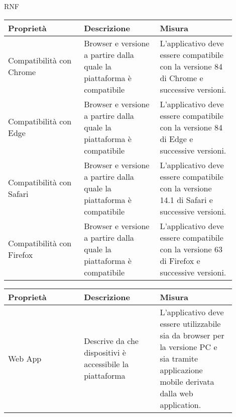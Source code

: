 \begin{listaPersonale}{RNF}
    \newpage
    \begin{tabular}{|p{0.3\linewidth}|p{0.3\linewidth}|p{0.3\linewidth}|}
        \hline
        \rowcolor{viola} \textbf{Proprietà} &
        \textbf{Descrizione}                &
        \textbf{Misura}                       \\
        \hline
        Compatibilità con Chrome            &
        Browser e versione a partire dalla
        quale la piattaforma è compatibile  &
        L'applicativo deve essere
        compatibile con la versione
        84 di Chrome e successive versioni.   \\
        \hline
        Compatibilità con Edge              &
        Browser e versione a partire dalla
        quale la piattaforma è compatibile  &
        L'applicativo deve essere
        compatibile con la versione
        84 di Edge e successive versioni.     \\
        \hline
        Compatibilità con Safari            &
        Browser e versione a partire dalla
        quale la piattaforma è compatibile  &
        L'applicativo deve essere
        compatibile con la versione
        14.1 di Safari e successive versioni. \\
        \hline
        Compatibilità con Firefox           &
        Browser e versione a partire dalla
        quale la piattaforma è compatibile  &
        L'applicativo deve essere
        compatibile con la versione
        63 di Firefox e successive versioni.  \\
        \hline
    \end{tabular}

    \begin{tabular}{|p{0.3\linewidth}|p{0.3\linewidth}|p{0.3\linewidth}|}
        \hline
        \rowcolor{viola} \textbf{Proprietà}                      &
        \textbf{Descrizione}                                     &
        \textbf{Misura}                                            \\
        \hline
        Web App                                                  &
        Descrive da che dispositivi è accessibile la piattaforma &
        L'applicativo deve essere utilizzabile sia da
        browser per la versione PC e sia tramite applicazione
        mobile derivata dalla web application.                     \\
        \hline
    \end{tabular}


\end{listaPersonale}
